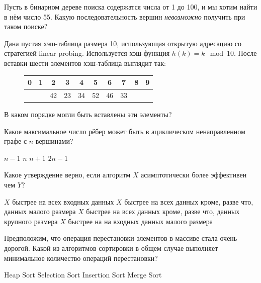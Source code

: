 \documentclass[12pt]{exam}
\begin{document}
\begin{questions}
\question[1] Пусть в бинарном дереве поиска содержатся числа от 1 до 100, и мы хотим найти в нём число 55. Какую последовательность вершин {\em невозможно} получить при таком поиске?
\begin{checkboxes}
\end{checkboxes}

\question[1] Дана пустая хэш-таблица размера 10, использующая открытую адресацию со стратегией linear probing. Используется хэш-функция $h(k) = k \mod 10$. После вставки шести элементов хэш-таблица выглядит так:
\begin{figure}[H]
  \begin{center}
    \begin{tabular}{|c|c|c|c|c|c|c|c|c|c|}
    \hline
    0 & 1 & 2  & 3  & 4  & 5  & 6  & 7  & 8 & 9 \\ \hline
    ~ & ~ & 42 & 23 & 34 & 52 & 46 & 33 & ~ & ~ \\ \hline
    \end{tabular}
  \end{center}
\end{figure}
В каком порядке могли быть вставлены эти элементы?

\begin{checkboxes}
\end{checkboxes}

\question[1] Какое максимальное число рёбер может быть в ациклическом ненаправленном графе с $n$ вершинами?
\begin{checkboxes}
\CorrectChoice $n-1$
\choice $n$
\choice $n+1$
\choice $2n-1$
\end{checkboxes}

\question[1] Какое утверждение верно, если алгоритм $X$ асимптотически более эффективен чем $Y$?
\begin{checkboxes}
\choice $X$ быстрее на всех входных данных
\CorrectChoice $X$ быстрее на всех данных кроме, разве что, данных малого размера
\choice $X$ быстрее на всех данных кроме, разве что, данных крупного размера
\choice $X$ быстрее на на входных данных малого размера
\end{checkboxes}

\question[2] Предположим, что операция перестановки элементов в массиве стала очень дорогой. Какой из алгоритмов сортировки в общем случае выполняет минимальное количество операций перестановки? 
\begin{checkboxes}
\choice Heap Sort
\CorrectChoice Selection Sort
\choice Insertion Sort
\choice Merge Sort
\end{checkboxes}


\end{questions}
\end{document}
